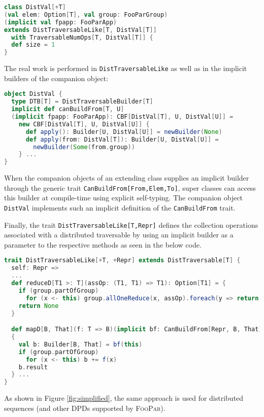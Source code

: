 \documentclass{article}
\newcommand{\framework}{{\rmfamily\scshape FooPar}\xspace}
\begin{document}
{\begin{lstlisting}[language=scala]
class DistVal[+T]
(val elem: Option[T], val group: FooParGroup)
(implicit val fpapp: FooParApp)
extends DistTraversableLike[T, DistVal[T]]
  with TraversableNumOps[T, DistVal[T]] {
  def size = 1
}
\end{lstlisting}
The real work is performed in \texttt{DistTraversableLike} as well as in the implicit builders of the companion object:
\begin{lstlisting}[language=scala]
object DistVal {
  type DTB[T] = DistTraversableBuilder[T]
  implicit def canBuildFrom[T, U]
  (implicit fpapp: FooParApp): CBF[DistVal[T], U, DistVal[U]] =
    new CBF[DistVal[T], U, DistVal[U]] {
      def apply(): Builder[U, DistVal[U]] = newBuilder(None)
      def apply(from: DistVal[T]): Builder[U, DistVal[U]] =
        newBuilder(Some(from.group))
    } ...
}
\end{lstlisting}

\noindent\sloppy
When the companion objects of an extending class supplies an implicit builder
through the generic trait \texttt{CanBuildFrom[From,Elem,To]}, super classes 
can access this builder at compile-time using explicit self-typing.
The companion object \texttt{DistVal} implements such an implicit definition
of the \texttt{CanBuildFrom} trait.


\sloppy
Finally, the trait \texttt{DistTraversableLike[T,Repr]} defines the collection operations
associated with a distributed traversable by using an implicit builder as a
parameter to the respective methods as seen in the below code.




\begin{lstlisting}[language=scala]
trait DistTraversableLike[+T, +Repr] extends DistTraversable[T] {
  self: Repr =>
  ...
  def reduceD[T1 >: T](assOp: (T1, T1) => T1): Option[T1] = {
    if (group.partOfGroup)
      for (x <- this) group.allOneReduce(x, assOp).foreach(y => return Some(y))
    return None
  }

  def mapD[B, That](f: T => B)(implicit bf: CanBuildFrom[Repr, B, That]): That =
  {
    val b: Builder[B, That] = bf(this)
    if (group.partOfGroup)
      for (x <- this) b += f(x)
    b.result
  } ...
}
\end{lstlisting}
As shown in Figure \ref{fig:simplified}, the same approach is used for
distributed sequences (and other DPDs supported by \framework).





}
\end{document}
